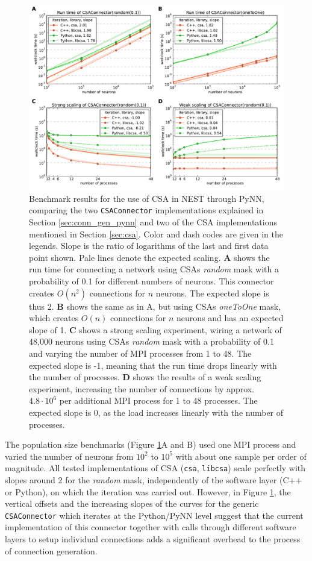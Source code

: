 \documentclass{frontiersSCNS} %
\begin{document}
\begin{figure}[ht]
\centering
\includegraphics[scale=.7]{benchmarks/CSAConnector.pdf}
\caption{Benchmark results for the use of CSA in NEST through PyNN,
  comparing the two \texttt{CSAConnector} implementations explained in
  Section \ref{sec:conn_gen_pynn} and two of the CSA implementations
  mentioned in Section \ref{sec:csa}. Color and dash codes are given
  in the legends. Slope is the ratio of logarithms of the last and
  first data point shown. Pale lines denote the expected
  scaling. \textbf{A} shows the run time for connecting a network
  using CSAs \emph{random} mask with a probability of 0.1 for
  different numbers of neurons. This connector creates $O(n^2)$
  connections for $n$ neurons. The expected slope is thus
  2. \textbf{B} shows the same as in A, but using CSAs \emph{oneToOne}
  mask, which creates $O(n)$ connections for $n$ neurons and has an
  expected slope of 1. \textbf{C} shows a strong scaling experiment,
  wiring a network of 48,000 neurons using CSAs \emph{random} mask
  with a probability of 0.1 and varying the number of MPI processes
  from 1 to 48. The expected slope is -1, meaning that the run time
  drops linearly with the number of processes. \textbf{D} shows the
  results of a weak scaling experiment, increasing the number of
  connections by approx. $4.8 \cdot 10^6$ per additional MPI process
  for 1 to 48 processes. The expected slope is 0, as the load
  increases linearly with the number of
  processes.}\label{fig:pynn_benchmarks}
\end{figure}

The population size benchmarks (Figure \ref{fig:pynn_benchmarks}A and
B) used one MPI process and varied the number of neurons from $10^2$
to $10^5$ with about one sample per order of magnitude. All tested
implementations of CSA (\verb|csa|, \verb|libcsa|) scale perfectly
with slopes around 2 for the \emph{random} mask, independently of the
software layer (C++ or Python), on which the iteration was carried
out. However, in Figure \ref{fig:pynn_benchmarks}, the vertical
offsets and the increasing slopes of the curves for the generic
\verb|CSAConnector| which iterates at the Python/PyNN level suggest
that the current implementation of this connector together with calls
through different software layers to setup individual connections adds
a significant overhead to the process of connection generation.
\end{document}

